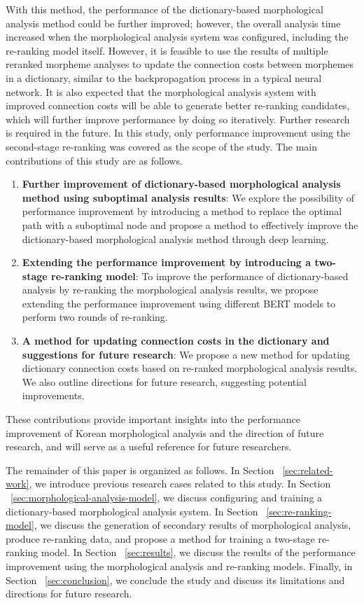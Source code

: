 \documentclass[AMS,STIX2COL]{WileyNJD-v2}
\begin{document}
    With this method, the performance of the dictionary-based morphological analysis method could be further improved; however, the overall analysis time increased when the morphological analysis system was configured, including the re-ranking model itself.
    However, it is feasible to use the results of multiple reranked morpheme analyses to update the connection costs between morphemes in a dictionary, similar to the backpropagation process in a typical neural network.
    It is also expected that the morphological analysis system with improved connection costs will be able to generate better re-ranking candidates, which will further improve performance by doing so iteratively.
    Further research is required in the future.
    In this study, only performance improvement using the second-stage re-ranking was covered as the scope of the study.
    The main contributions of this study are as follows.
    \begin{enumerate}
        \item \textbf{Further improvement of dictionary-based morphological analysis method using suboptimal analysis results}: We explore the possibility of performance improvement by introducing a method to replace the optimal path with a suboptimal node and propose a method to effectively improve the dictionary-based morphological analysis method through deep learning.
        \item \textbf{Extending the performance improvement by introducing a two-stage re-ranking model}: To improve the performance of dictionary-based analysis by re-ranking the morphological analysis results, we propose extending the performance improvement using different BERT models to perform two rounds of re-ranking.
        \item \textbf{A method for updating connection costs in the dictionary and suggestions for future research}: We propose a new method for updating dictionary connection costs based on re-ranked morphological analysis results. We also outline directions for future research, suggesting potential improvements.
    \end{enumerate}
    These contributions provide important insights into the performance improvement of Korean morphological analysis and the direction of future research, and will serve as a useful reference for future researchers.

    The remainder of this paper is organized as follows.
    In Section ~\ref{sec:related-work}, we introduce previous research cases related to this study. In Section ~\ref{sec:morphological-analysis-model}, we discuss configuring and training a dictionary-based morphological analysis system.
    In Section ~\ref{sec:re-ranking-model}, we discuss the generation of secondary results of morphological analysis, produce re-ranking data, and propose a method for training a two-stage re-ranking model.
    In Section ~\ref{sec:results}, we discuss the results of the performance improvement using the morphological analysis and re-ranking models.
    Finally, in Section ~\ref{sec:conclusion}, we conclude the study and discuss its limitations and directions for future research.
\end{document}
